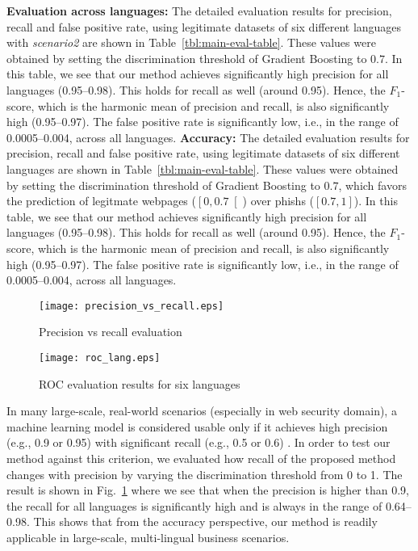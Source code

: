 \documentclass[10pt,conference,compsocconf,letterpaper]{IEEEtran}
\begin{document}
\textbf{Evaluation across languages:} The detailed evaluation results for precision, recall and false positive rate, using legitimate datasets of six different languages with \textit{scenario2} are shown in Table~\ref{tbl:main-eval-table}. These values were obtained by setting the discrimination threshold of Gradient Boosting to $0.7$. 
In this table, we see that our method achieves significantly high precision for all languages (0.95--0.98). This holds for recall as well (around 0.95). Hence, the $F_1$-score, which is the harmonic mean of precision and recall, is also significantly high  (0.95--0.97). The false positive rate is significantly low, i.e., in the range of 0.0005--0.004, across all languages. 
\else
\noindent\textbf{Accuracy:}
The detailed evaluation results for precision, recall and false positive rate, using legitimate datasets of six different languages are shown in Table~\ref{tbl:main-eval-table}. These values were obtained by setting the discrimination threshold of Gradient Boosting to $0.7$, which favors the prediction of legitmate webpages  ($ \left[0, 0.7 \right[ $) over phishs ($ \left[0.7, 1 \right] $). 
In this table, we see that our method achieves significantly high precision for all languages (0.95--0.98). This holds for recall as well (around 0.95). Hence, the $F_1$-score, which is the harmonic mean of precision and recall, is also significantly high (0.95--0.97). The false positive rate is significantly low, i.e., in the range of 0.0005--0.004, across all languages.
\fi

\begin{figure}[th]
                \centering
                \texttt{[image: precision\_vs\_recall.eps]}
                \caption{Precision vs recall evaluation}
                \label{fig:precision-vs-recall}
\end{figure} 

\begin{figure}[th]
                \centering
                \texttt{[image: roc\_lang.eps]}
                \caption{ROC evaluation results for six languages}
                \label{fig:roc-lang}
\end{figure} 

In many large-scale, real-world scenarios (especially in web security domain),  a machine learning model is considered usable only if it achieves high precision (e.g., 0.9 or 0.95) with significant recall (e.g., 0.5 or 0.6) \cite{singh:2012:large}. In order to test our method against this criterion, we evaluated how recall of the proposed method changes with precision by varying the discrimination threshold from 0 to 1. The result is shown in Fig.~\ref{fig:precision-vs-recall} where we see that when the precision is higher than 0.9, the recall for all languages is significantly high and is always in the range of 0.64--0.98. This shows that from the accuracy perspective, our method is readily applicable  in large-scale, multi-lingual business scenarios.
\end{document}
